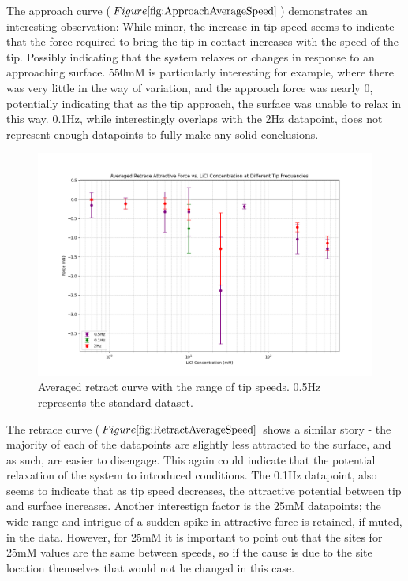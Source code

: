 The approach curve ($Figure \ref{fig:ApproachAverageSpeed}$) demonstrates an interesting observation: While minor, the increase in tip speed seems to indicate that the force required to bring the tip in contact increases with the speed of the tip. Possibly indicating that the system relaxes or changes in response to an approaching surface. 550mM is particularly interesting for example, where there was very little in the way of variation, and the approach force was nearly 0, potentially indicating that as the tip approach, the surface was unable to relax in this way. 0.1Hz, while interestingly overlaps with the 2Hz datapoint, does not represent enough datapoints to fully make any solid conclusions. 

\begin{figure}[h!]
\centering
\includegraphics[width=\textwidth]{chapter7/Tip speed/Overall graph retrace.png}
\caption{Averaged retract curve with the range of tip speeds. 0.5Hz represents the standard dataset.}
\label{fig:RetractAverageSpeed}
\end{figure}

The retrace curve ($Figure \ref{fig:RetractAverageSpeed}$ shows a similar story - the majority of each of the datapoints are slightly less attracted to the surface, and as such, are easier to disengage. This again could indicate that the potential relaxation of the system to introduced conditions. The 0.1Hz datapoint, also seems to indicate that as tip speed decreases, the attractive potential between tip and surface increases. Another interestign factor is the 25mM datapoints; the wide range and intrigue of a sudden spike in attractive force is retained, if muted, in the data. However, for 25mM it is important to point out that the sites for 25mM values are the same between speeds, so if the cause is due to the site location themselves that would not be changed in this case.

